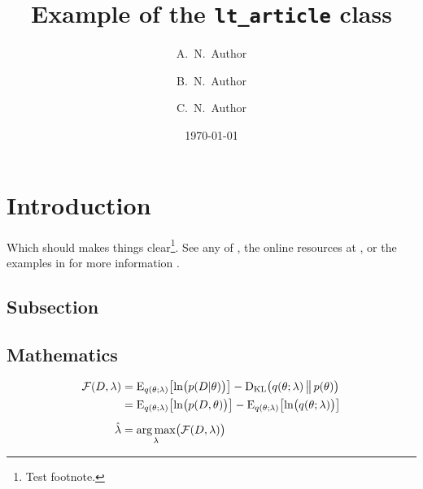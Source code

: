 \documentclass[a4paper, 11pt]{lt_article}
\title{Example of the \texttt{lt\_article} class}
\author[a,\corrmark]{A.~N.~Author}
\author[a,b]{B.~N.~Author}
\author[c]{C.~N.~Author}
\affiliation{Institution 1}
\affiliation{Institution 2}
\affiliation{Institution 3}
\date{\today}
\begin{document}
\maketitle
\printAffiliations

\begin{abstract} %

\blindtext

\end{abstract} %


\section{Introduction} %

\blindtext
Which should makes things clear\footnote{Test footnote.}.
See any of \textcite{Bayes}, the online resources at
, or the examples in
 for more information \autocite{GravitationalWaves}.

\subsection{Subsection} %

\blindtext

\begin{displayquote}
    \blindtext
\end{displayquote}

\blindtext

\subsection{Mathematics} %

\blindtext

\begin{equation}
\begin{split}
    \func{\FreeEnergy}{D, \lambda}
    & = \expecWRT{ \lnFunc{\cDist{p}{D}{\theta}} }{ \pDist{q}{\theta}{\lambda} }
    - \DKL{ \pDist{q}{\theta}{\lambda} }{ \dist{p}{\theta} }
    \\
    & = \expecWRT{ \lnFunc{\dist{p}{D, \theta}} }{ \pDist{q}{\theta}{\lambda} }
    - \expecWRT{ \lnFunc{\pDist{q}{\theta}{\lambda}} }{ \pDist{q}{\theta}{\lambda} }
    \\[5pt]
    \hat{\lambda}
    & = \Func{ \argmax_{\lambda} }{ \func{\FreeEnergy}{D, \lambda} }
\end{split}
\end{equation}
\end{document}

